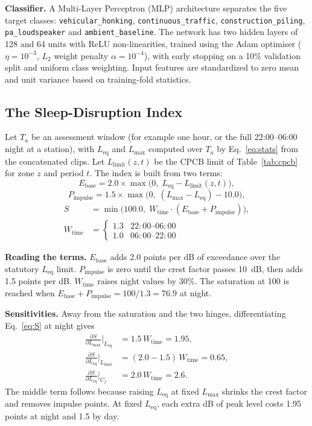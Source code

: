 \documentclass[conference]{IEEEtran}
\newcommand{\Leq}{L_{\text{eq}}}
\newcommand{\Lmax}{L_{\max}}
\newcommand{\Cf}{C_f}
\newcommand{\Lbase}{E_{\text{base}}}
\newcommand{\Pimp}{P_{\text{impulse}}}
\newcommand{\Wt}{W_{\text{time}}}
\newcommand{\cls}[1]{\texttt{#1}}
\begin{document}
\textbf{Classifier.} A Multi-Layer Perceptron (MLP) architecture separates the five target classes: \cls{vehicular\_honking}, \cls{continuous\_traffic}, \cls{construction\_piling}, \cls{pa\_loudspeaker} and \cls{ambient\_baseline}. The network has two hidden layers of 128 and 64 units with ReLU non-linearities, trained using the Adam optimiser ($\eta = 10^{-3}$, $L_2$ weight penalty $\alpha = 10^{-4}$), with early stopping on a 10\% validation split and uniform class weighting. Input features are standardized to zero mean and unit variance based on training-fold statistics.

\subsection{The Sleep-Disruption Index}

Let $T_a$ be an assessment window (for example one hour, or the full 22:00--06:00 night at a station), with $\Leq$ and $\Lmax$ computed over $T_a$ by Eq.~\eqref{eq:stats} from the concatenated clips. Let $L_{\text{limit}}(z,t)$ be the CPCB limit of Table~\ref{tab:cpcb} for zone $z$ and period $t$. The index is built from two terms:
\begin{equation}
\Lbase = 2.0\times\max\!\big(0,\;\Leq-L_{\text{limit}}(z,t)\big),
\label{eq:ebase}
\end{equation}
\begin{equation}
\Pimp = 1.5\times\max\!\big(0,\;(\Lmax-\Leq)-10.0\big),
\label{eq:pimp}
\end{equation}
\begin{equation}
\begin{split}
S&=\min\!\big(100.0,\;\Wt\cdot(\Lbase+\Pimp)\big),\\
\Wt&=\begin{cases}1.3 & 22{:}00\text{--}06{:}00\\ 1.0 & 06{:}00\text{--}22{:}00\end{cases}
\end{split}
\label{eq:S}
\end{equation}

\textbf{Reading the terms.} $\Lbase$ adds 2.0 points per dB of exceedance over the statutory $\Leq$ limit. $\Pimp$ is zero until the crest factor passes 10~dB, then adds 1.5 points per dB. $\Wt$ raises night values by 30\%. The saturation at 100 is reached when $\Lbase + \Pimp = 100/1.3 = 76.9$ at night.

\textbf{Sensitivities.} Away from the saturation and the two hinges, differentiating Eq.~\eqref{eq:S} at night gives
\begin{equation}
\begin{split}
\frac{\partial S}{\partial \Lmax}\Big|_{\Leq}&=1.5\,\Wt=1.95,\\
\frac{\partial S}{\partial \Leq}\Big|_{\Lmax}&=(2.0-1.5)\,\Wt=0.65,\\
\frac{\partial S}{\partial \Leq}\Big|_{\Cf}&=2.0\,\Wt=2.6.
\end{split}
\label{eq:sens}
\end{equation}
The middle term follows because raising $\Leq$ at fixed $\Lmax$ shrinks the crest factor and removes impulse points. At fixed $\Leq$, each extra dB of peak level costs 1.95 points at night and 1.5 by day.
\end{document}
